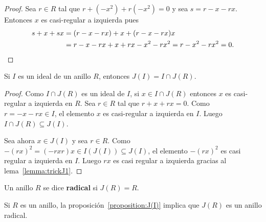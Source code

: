\begin{proof}
	Sea $r\in R$ tal que $r+(-x^2)+r(-x^2)=0$ y sea $s=r-x-rx$. Entonces $x$ es
	casi-regular a izquierda pues 
	\begin{align*}
		s+x+sx&=(r-x-rx)+x+(r-x-rx)x\\
		&=r-x-rx+x+rx-x^2-rx^2=r-x^2-rx^2=0.\qedhere 
\end{align*}
\end{proof}

%

\begin{proposition}
	\label{proposition:J(I)}
	Si $I$ es un ideal de un anillo $R$, entonces $J(I)=I\cap J(R)$. 
\end{proposition}

\begin{proof}
	Como $I\cap J(R)$ es un ideal de $I$, si $x\in I\cap J(R)$ entonces $x$ es
	casi-regular a izquierda en $R$. Sea $r\in R$ tal que $r+x+rx=0$. 
	Como $r=-x-rx\in I$, el elemento $x$ es casi-regular a 
	izquierda en $I$. Luego $I\cap J(R)\subseteq J(I)$. 

	Sea ahora $x\in J(I)$ y sea $r\in R$. Como $-(rx)^2=(-rxr)x\in
	I(J(I))\subseteq J(I)$, el elemento $-(rx)^2$ es casi regular a izquierda
	en $I$. Luego $rx$ es casi regular a izquierda gracias al
	lema~\ref{lemma:trickJ1}.
\end{proof}

\begin{definition}
	Un anillo $R$ se dice \textbf{radical} si $J(R)=R$.
\end{definition}

\begin{example}
	Si $R$ es un anillo, la proposición~\ref{proposition:J(I)} implica que
	$J(R)$ es un anillo radical.
\end{example}

